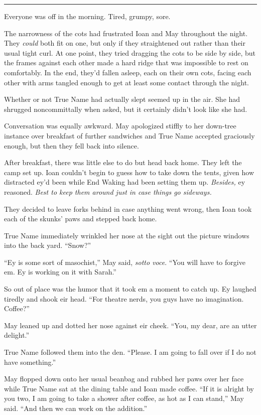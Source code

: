 \begin{center}\rule{0.5\linewidth}{0.5pt}\end{center}

Everyone was off in the morning. Tired, grumpy, sore.

The narrowness of the cots had frustrated Ioan and May throughout the night. They \emph{could} both fit on one, but only if they straightened out rather than their usual tight curl. At one point, they tried dragging the cots to be side by side, but the frames against each other made a hard ridge that was impossible to rest on comfortably. In the end, they'd fallen asleep, each on their own cots, facing each other with arms tangled enough to get at least some contact through the night.

Whether or not True Name had actually slept seemed up in the air. She had shrugged noncommittally when asked, but it certainly didn't look like she had.

Conversation was equally awkward. May apologized stiffly to her down-tree instance over breakfast of further sandwiches and True Name accepted graciously enough, but then they fell back into silence.

After breakfast, there was little else to do but head back home. They left the camp set up. Ioan couldn't begin to guess how to take down the tents, given how distracted ey'd been while End Waking had been setting them up. \emph{Besides,} ey reasoned. \emph{Best to keep them around just in case things go sideways.}

They decided to leave forks behind in case anything went wrong, then Ioan took each of the skunks' paws and stepped back home.

True Name immediately wrinkled her nose at the sight out the picture windows into the back yard. ``Snow?''

``Ey is some sort of masochist,'' May said, \emph{sotto voce}. ``You will have to forgive em. Ey is working on it with Sarah.''

So out of place was the humor that it took em a moment to catch up. Ey laughed tiredly and shook eir head. ``For theatre nerds, you guys have no imagination. Coffee?''

May leaned up and dotted her nose against eir cheek. ``You, my dear, are an utter delight.''

True Name followed them into the den. ``Please. I am going to fall over if I do not have something.''

May flopped down onto her usual beanbag and rubbed her paws over her face while True Name sat at the dining table and Ioan made coffee. ``If it is alright by you two, I am going to take a shower after coffee, as hot as I can stand,'' May said. ``And then we can work on the addition.''


